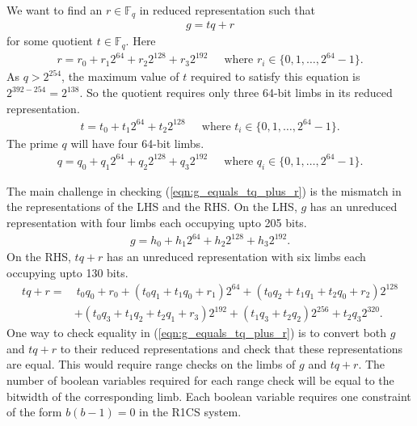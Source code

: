 \documentclass[a4paper, 12pt]{article}
\begin{document}
We want to find an $r \in \mathbb{F}_q$ in reduced representation such that 
\begin{align}
  g = tq+r
  \label{eqn:g_equals_tq_plus_r}
\end{align}
for some quotient $t \in \mathbb{F}_q$. Here
\begin{align*}
  r = r_0 + r_1 2^{64} + r_2 2^{128} + r_3 2^{192} \ \ \ \ \ \text{ where } r_i \in \{0,1,\ldots,2^{64}-1\}.
\end{align*}
As $q > 2^{254}$, the maximum value of $t$ required to satisfy this equation is $2^{392-254} = 2^{138}$. So the quotient requires only three 64-bit limbs in its reduced representation.
\begin{align*}
  t = t_0 + t_1 2^{64} + t_2 2^{128}\ \ \ \ \ \text{ where } t_i \in \{0,1,\ldots,2^{64}-1\}.
\end{align*}
The prime $q$ will have four 64-bit limbs.
\begin{align*}
  q = q_0 + q_1 2^{64} + q_2 2^{128} + q_3 2^{192} \ \ \ \ \ \text{ where } q_i \in \{0,1,\ldots,2^{64}-1\}.
\end{align*}

The main challenge in checking (\ref{eqn:g_equals_tq_plus_r}) is the mismatch in the representations of the LHS and the RHS. On the LHS, $g$ has an unreduced representation with four limbs each occupying upto 205 bits.
\begin{align*}
   g = h_0 + h_1 2^{64} + h_2 2^{128} + h_3 2^{192}.
\end{align*}
On the RHS, $tq+r$ has an unreduced representation with six limbs each occupying upto 130 bits.
\begin{align*}
  tq+r  =&\ t_0q_0+r_0 + (t_0q_1 + t_1q_0 + r_1) 2^{64} + (t_0q_2 + t_1q_1 + t_2q_0 + r_2) 2^{128}\\
  & + (t_0q_3 + t_1q_2 + t_2q_1 + r_3) 2^{192}+ (t_1q_3 + t_2q_2) 2^{256} + t_2q_3 2^{320}.
\end{align*}
One way to check equality in (\ref{eqn:g_equals_tq_plus_r}) is to convert both $g$ and $tq+r$ to their reduced representations and check that these representations are equal. This would require range checks on the limbs of $g$ and $tq+r$. The number of boolean variables required for each range check will be equal to the bitwidth of the corresponding limb. Each boolean variable requires one constraint of the form $b(b-1) = 0$ in the R1CS system.
\end{document}

